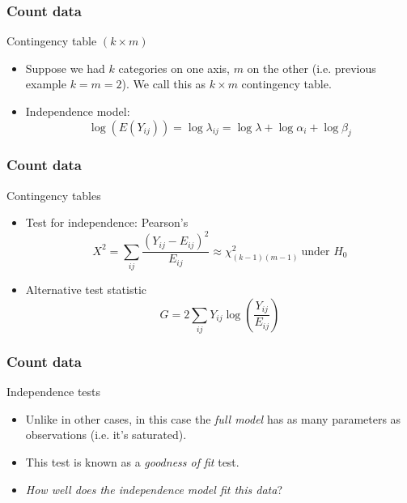 \documentclass[handout]{beamer}
\begin{document}

   \begin{frame} \frametitle{Count data}

   \begin{block}
       {Contingency table $(k \times m)$}
       \begin{itemize}
       \item     Suppose we had $k$ categories on one axis, $m$ on the other
       (i.e. previous example $k = m = 2$). We call this as $k \times m$
       contingency table.

     \item Independence model:
   $$        \log(E (Y_{ij} )) = \log \lambda_{ij} = \log \lambda  + \log \alpha_i + \log \beta_j$$



       \end{itemize}
   \end{block}
   \end{frame}


   \begin{frame} \frametitle{Count data}

   \begin{block}
       {Contingency tables}
       \begin{itemize}
    \item Test for independence: Pearson's
   $$
   X^2 = \sum_{ij} \frac{(Y_{ij}-E_{ij})^2}{E_{ij}} \approx \chi^2_{(k-1)(m-1)} \  \text{under $H_0$}$$


       \item Alternative test statistic
   $$
   G = 2\sum_{ij} Y_{ij} \log \left(\frac{Y_{ij}}{E_{ij}}\right)$$
       \end{itemize}
   \end{block}
   \end{frame}


   \begin{frame} \frametitle{Count data}

   \begin{block}
       {Independence tests}
       \begin{itemize}[<+->]
       \item Unlike in other cases, in this case the {\em full model}
       has as many parameters as observations (i.e. it's saturated).

       \item This test is known as a {\em goodness of fit} test.
       \item {\em How well does the independence model fit this data}?
       \end{itemize}
   \end{block}
   \end{frame}
\end{document}
